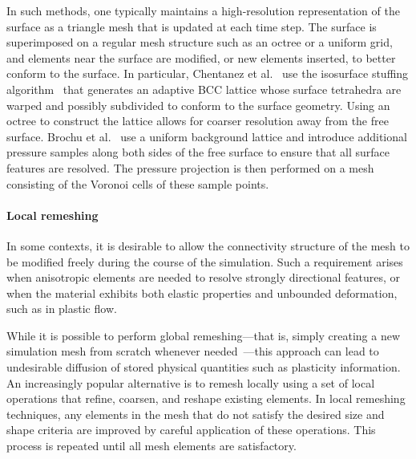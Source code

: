 In such methods, one typically maintains a high-resolution representation of the surface as a triangle mesh that is updated at each time step.
The surface is superimposed on a regular mesh structure such as an octree or a uniform grid, and elements near the surface are modified, or new elements inserted, to better conform to the surface.
In particular, Chentanez et al.~\cite{Chentanez2007} use the isosurface stuffing algorithm~\cite{Labelle2007} that generates an adaptive BCC lattice whose surface tetrahedra are warped and possibly subdivided to conform to the surface geometry.
Using an octree to construct the lattice allows for coarser resolution away from the free surface.
Brochu et al.~\cite{Brochu2010} use a uniform background lattice and introduce additional pressure samples along both sides of the free surface to ensure that all surface features are resolved.
The pressure projection is then performed on a mesh consisting of the Voronoi cells of these sample points.

\paragraph*{Local remeshing}
In some contexts, it is desirable to allow the connectivity structure of the mesh to be modified freely during the course of the simulation.
Such a requirement arises when anisotropic elements are needed to resolve strongly directional features, or when the material exhibits both elastic properties and unbounded deformation, such as in plastic flow.

While it is possible to perform global remeshing---that is, simply creating a new simulation mesh from scratch whenever needed~\cite{Klingner2006,Bargteil2007}---this approach can lead to undesirable diffusion of stored physical quantities such as plasticity information.
An increasingly popular alternative is to remesh locally using a set of local operations that refine, coarsen, and reshape existing elements.
In local remeshing techniques, any elements in the mesh that do not satisfy the desired size and shape criteria are improved by careful application of these operations.
This process is repeated until all mesh elements are satisfactory.

